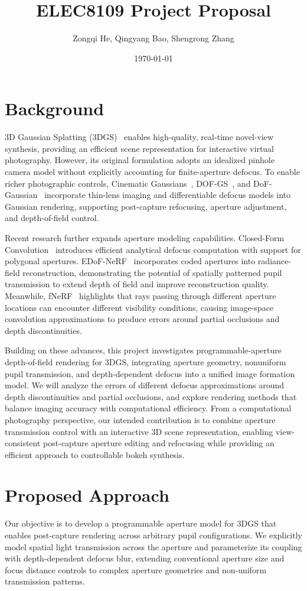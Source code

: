 \documentclass{article}
\title{ELEC8109 Project Proposal}
\author{Zongqi He, Qingyang Bao, Shengrong Zhang}
\date{\today}
\begin{document}
\maketitle

\section{Background}
3D Gaussian Splatting (3DGS)~\cite{3dgs} enables high-quality, real-time novel-view synthesis, providing an efficient scene representation for interactive virtual photography. However, its original formulation adopts an idealized pinhole camera model without explicitly accounting for finite-aperture defocus. To enable richer photographic controls, Cinematic Gaussians~\cite{cinematicgaussians}, DOF-GS~\cite{dofgs}, and DoF-Gaussian~\cite{dofgaussian} incorporate thin-lens imaging and differentiable defocus models into Gaussian rendering, supporting post-capture refocusing, aperture adjustment, and depth-of-field control.

Recent research further expands aperture modeling capabilities. Closed-Form Convolution~\cite{closedformconvolution} introduces efficient analytical defocus computation with support for polygonal apertures. EDoF-NeRF~\cite{edofnerf} incorporates coded apertures into radiance-field reconstruction, demonstrating the potential of spatially patterned pupil transmission to extend depth of field and improve reconstruction quality. Meanwhile, fNeRF~\cite{fnerf} highlights that rays passing through different aperture locations can encounter different visibility conditions, causing image-space convolution approximations to produce errors around partial occlusions and depth discontinuities.

Building on these advances, this project investigates programmable-aperture depth-of-field rendering for 3DGS, integrating aperture geometry, nonuniform pupil transmission, and depth-dependent defocus into a unified image formation model. We will analyze the errors of different defocus approximations around depth discontinuities and partial occlusions, and explore rendering methods that balance imaging accuracy with computational efficiency. From a computational photography perspective, our intended contribution is to combine aperture transmission control with an interactive 3D scene representation, enabling view-consistent post-capture aperture editing and refocusing while providing an efficient approach to controllable bokeh synthesis.
\section{Proposed Approach}
Our objective is to develop a programmable aperture model for 3DGS that enables post-capture rendering across arbitrary pupil configurations. We explicitly model spatial light transmission across the aperture and parameterize its coupling with depth-dependent defocus blur, extending conventional aperture size and focus distance controls to complex aperture geometries and non-uniform transmission patterns.
\end{document}

